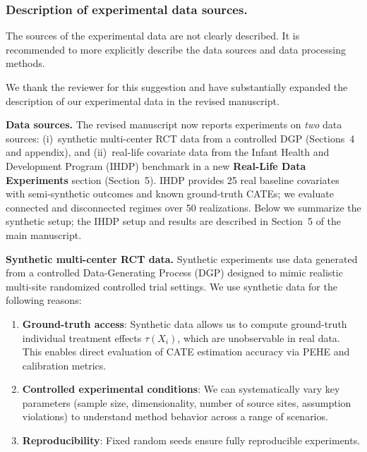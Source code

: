 \subsubsection{Description of experimental data sources.}  
The sources of the experimental data are not clearly described. It is recommended to more explicitly describe the data sources and data processing methods.

{\color{blue}
We thank the reviewer for this suggestion and have substantially expanded the description of our experimental data in the revised manuscript.

\medskip
\noindent\textbf{Data sources.}
The revised manuscript now reports experiments on \emph{two} data sources: (i)~synthetic multi-center RCT data from a controlled DGP (Sections~4 and appendix), and (ii)~real-life covariate data from the Infant Health and Development Program (IHDP) benchmark in a new \textbf{Real-Life Data Experiments} section (Section~5). IHDP provides 25 real baseline covariates with semi-synthetic outcomes and known ground-truth CATEs; we evaluate connected and disconnected regimes over 50 realizations. Below we summarize the synthetic setup; the IHDP setup and results are described in Section~5 of the main manuscript.

\medskip
\noindent\textbf{Synthetic multi-center RCT data.}
Synthetic experiments use data generated from a controlled Data-Generating Process (DGP) designed to mimic realistic multi-site randomized controlled trial settings. We use synthetic data for the following reasons:
\begin{enumerate}[leftmargin=*]
\item \textbf{Ground-truth access}: Synthetic data allows us to compute ground-truth individual treatment effects $\tau(X_i)$, which are unobservable in real data. This enables direct evaluation of CATE estimation accuracy via PEHE and calibration metrics.
\item \textbf{Controlled experimental conditions}: We can systematically vary key parameters (sample size, dimensionality, number of source sites, assumption violations) to understand method behavior across a range of scenarios.
\item \textbf{Reproducibility}: Fixed random seeds ensure fully reproducible experiments.
\end{enumerate}

}
